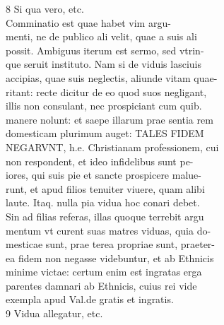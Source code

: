 \documentclass{article}
\begin{document}
\begin{pages}
                8 Si qua vero, etc. \\
                Comminatio est quae habet vim argu- \\
                menti, ne de publico ali velit, quae a suis ali \\
                possit. Ambiguus iterum est sermo, sed vtrin- \\
                que seruit instituto. Nam si de viduis lasciuis \\
                accipias, quae suis neglectis, aliunde vitam quae- \\
                ritant: recte dicitur de eo quod suos negligant, \\
                illis non consulant, nec prospiciant cum quib. \\
                manere nolunt: et saepe illarum prae sentia rem \\
                domesticam plurimum auget: TALES FIDEM \\
                NEGARVNT, h.e. Christianam professionem, cui \\
                non respondent, et ideo infidelibus sunt pe- \\
                iores, qui suis pie et sancte prospicere malue- \\
                runt, et apud filios tenuiter viuere, quam alibi \\
                laute. Itaq. nulla pia vidua hoc conari debet. \\
                Sin ad filias referas, illas quoque terrebit argu \\
                mentum vt curent suas matres viduas, quia do- \\
                mesticae sunt, prae terea propriae sunt, praeter- \\
                ea fidem non negasse videbuntur, et ab Ethnicis \\
                minime victae: certum enim est ingratas erga \\
                parentes damnari ab Ethnicis, cuius rei vide \\
                exempla apud Val.de gratis et ingratis. \\
                9 Vidua allegatur, etc. \\

\end{pages}
\end{document}
